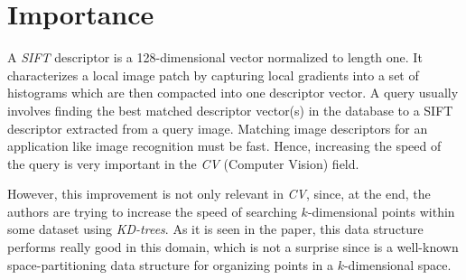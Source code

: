 \section{Importance}
A \textit{SIFT} descriptor is a 128-dimensional vector normalized to length one. It characterizes a local image patch by capturing local gradients into a set of histograms which are then compacted into one descriptor vector. A query usually involves finding the best matched descriptor vector(s) in the database to a SIFT descriptor extracted from a query image. Matching image descriptors for an application like image recognition must be fast. Hence, increasing the speed of the query is very important in the \textit{CV} (Computer Vision) field. 

However, this improvement is not only relevant in \textit{CV}, since, at the end, the authors are trying to increase the speed of searching $k$-dimensional points within some dataset using \textit{KD-trees}. As it is seen in the paper, this data structure performs really good in this domain, which is not a surprise since is a well-known space-partitioning data structure for organizing points in a $k$-dimensional space.
